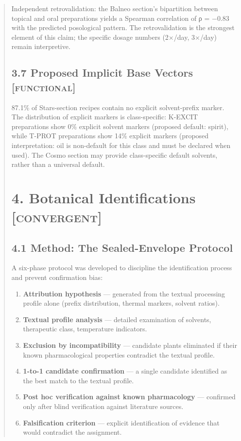 \documentclass[11pt,a4paper]{article}
\begin{document}
\begin{abstract}
Independent retrovalidation: the Balneo section's bipartition between topical and oral preparations yields a Spearman correlation of ρ = −0.83 with the predicted posological pattern. The retrovalidation is the strongest element of this claim; the specific dosage numbers (2×/day, 3×/day) remain interpretive.

\subsection*{3.7 Proposed Implicit Base Vectors \textsc{[functional]}}

87.1\% of Stars-section recipes contain no explicit solvent-prefix marker. The distribution of explicit markers is class-specific: K-EXCIT preparations show 0\% explicit solvent markers (proposed default: spirit), while T-PROT preparations show 14\% explicit markers (proposed interpretation: oil is non-default for this class and must be declared when used). The Cosmo section may provide class-specific default solvents, rather than a universal default.

\section*{4. Botanical Identifications \textsc{[convergent]}}

\subsection*{4.1 Method: The Sealed-Envelope Protocol}

A six-phase protocol was developed to discipline the identification process and prevent confirmation bias:

\begin{enumerate}[leftmargin=2em]
\item \textbf{Attribution hypothesis} --- generated from the textual processing profile alone (prefix distribution, thermal markers, solvent ratios).
\item \textbf{Textual profile analysis} --- detailed examination of solvents, therapeutic class, temperature indicators.
\item \textbf{Exclusion by incompatibility} --- candidate plants eliminated if their known pharmacological properties contradict the textual profile.
\item \textbf{1-to-1 candidate confirmation} --- a single candidate identified as the best match to the textual profile.
\item \textbf{Post hoc verification against known pharmacology} --- confirmed only after blind verification against literature sources.
\item \textbf{Falsification criterion} --- explicit identification of evidence that would contradict the assignment.
\end{enumerate}


\end{abstract}
\end{document}
